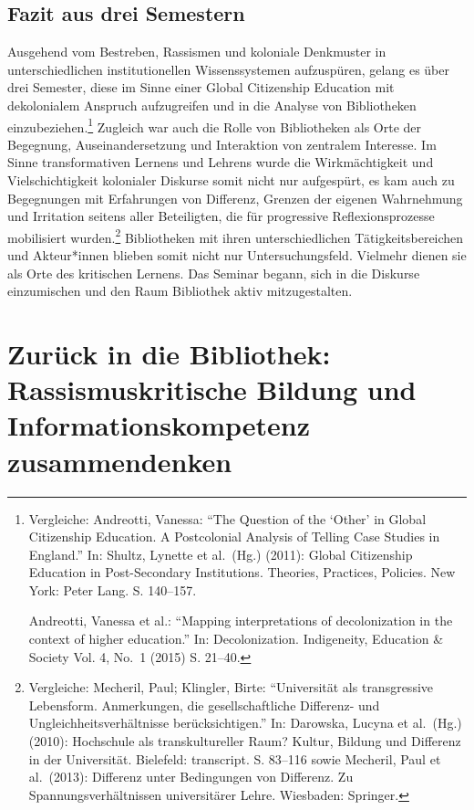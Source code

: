 \documentclass[a4paper,
fontsize=11pt,
oneside,
numbers=noperiodatend,
parskip=half-,
bibliography=totoc,
final
]{scrartcl}
\begin{document}
\hypertarget{fazit-aus-drei-semestern}{%
\subsection{Fazit aus drei Semestern}\label{fazit-aus-drei-semestern}}

Ausgehend vom Bestreben, Rassismen und koloniale Denkmuster in
unterschiedlichen institutionellen Wissenssystemen aufzuspüren, gelang
es über drei Semester, diese im Sinne einer Global Citizenship Education
mit dekolonialem Anspruch aufzugreifen und in die Analyse von
Bibliotheken einzubeziehen.\footnote{Vergleiche: Andreotti, Vanessa:
  \enquote{The Question of the \enquote*{Other} in Global Citizenship
  Education. A Postcolonial Analysis of Telling Case Studies in
  England.} In: Shultz, Lynette et al.~(Hg.) (2011): Global Citizenship
  Education in Post-Secondary Institutions. Theories, Practices,
  Policies. New York: Peter Lang. S. 140--157.

  Andreotti, Vanessa et al.: \enquote{Mapping interpretations of
  decolonization in the context of higher education.} In:
  Decolonization. Indigeneity, Education \& Society Vol. 4, No.~1 (2015)
  S. 21--40.} Zugleich war auch die Rolle von Bibliotheken als Orte der
Begegnung, Auseinandersetzung und Interaktion von zentralem Interesse.
Im Sinne transformativen Lernens und Lehrens wurde die Wirkmächtigkeit
und Vielschichtigkeit kolonialer Diskurse somit nicht nur aufgespürt, es
kam auch zu Begegnungen mit Erfahrungen von Differenz, Grenzen der
eigenen Wahrnehmung und Irritation seitens aller Beteiligten, die für
progressive Reflexionsprozesse mobilisiert wurden.\footnote{Vergleiche:
  Mecheril, Paul; Klingler, Birte: \enquote{Universität als
  transgressive Lebensform. Anmerkungen, die gesellschaftliche
  Differenz- und Ungleichheitsverhältnisse berücksichtigen.} In:
  Darowska, Lucyna et al.~(Hg.) (2010): Hochschule als transkultureller
  Raum? Kultur, Bildung und Differenz in der Universität. Bielefeld:
  transcript. S. 83--116 sowie Mecheril, Paul et al.~(2013): Differenz
  unter Bedingungen von Differenz. Zu Spannungsverhältnissen
  universitärer Lehre. Wiesbaden: Springer.} Bibliotheken mit ihren
unterschiedlichen Tätigkeitsbereichen und Akteur*innen blieben somit
nicht nur Untersuchungsfeld. Vielmehr dienen sie als Orte des kritischen
Lernens. Das Seminar begann, sich in die Diskurse einzumischen und den
Raum Bibliothek aktiv mitzugestalten.

\hypertarget{zuruxfcck-in-die-bibliothek-rassismuskritische-bildung-und-informationskompetenz-zusammendenken}{%
\section{Zurück in die Bibliothek: Rassismuskritische Bildung und
Informationskompetenz
zusammendenken}\label{zuruxfcck-in-die-bibliothek-rassismuskritische-bildung-und-informationskompetenz-zusammendenken}}
\end{document}
